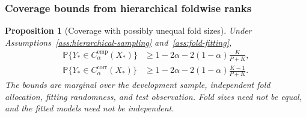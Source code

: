 \documentclass[11pt]{article}
\newtheorem{proposition}{Proposition}
\begin{document}
\subsubsection{Coverage bounds from hierarchical foldwise ranks}

\begin{proposition}[Coverage with possibly unequal fold sizes]
\label{prop:foldwise-protein-coverage}
Under Assumptions~\ref{ass:hierarchical-sampling} and~\ref{ass:fold-fitting},
\begin{align}
 \mathbb P\{Y_*\in C_{\alpha}^{\mathrm{emp}}(X_*)\}
 &\geq1-2\alpha-2(1-\alpha)\frac{K}{P+K},
 \label{eq:empirical-foldwise-bound}\\
 \mathbb P\{Y_*\in C_{\alpha}^{\mathrm{corr}}(X_*)\}
 &\geq1-2\alpha-2(1-\alpha)\frac{K-1}{P+K}.
 \label{eq:corrected-foldwise-bound}
\end{align}
The bounds are marginal over the development sample, independent fold allocation, fitting randomness, and test observation. Fold sizes need not be equal, and the fitted models need not be independent.
\end{proposition}
\end{document}
